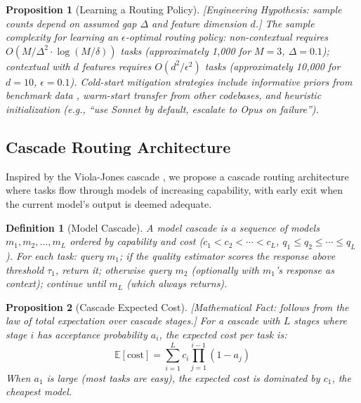 \documentclass[11pt, a4paper]{googledeepmind}
\newtheorem{definition}{Definition}[section]
\newtheorem{proposition}{Proposition}[section]
\begin{document}
\begin{proposition}[Learning a Routing Policy]
\emph{[Engineering Hypothesis: sample counts depend on assumed gap $\Delta$ and feature dimension $d$.]}
\label{prop:routing-sample}
The sample complexity for learning an $\epsilon$-optimal routing policy: non-contextual requires $O(M / \Delta^2 \cdot \log(M / \delta))$ tasks (approximately 1,000 for $M = 3$, $\Delta = 0.1$); contextual with $d$ features requires $O(d^2 / \epsilon^2)$ tasks (approximately 10,000 for $d = 10$, $\epsilon = 0.1$). Cold-start mitigation strategies include informative priors from benchmark data \citep{agrawal2012thompson}, warm-start transfer from other codebases, and heuristic initialization (e.g., ``use Sonnet by default, escalate to Opus on failure'').
\end{proposition}

\subsection{Cascade Routing Architecture}

Inspired by the Viola-Jones cascade \citep{violajones2001, violajones2004}, we propose a cascade routing architecture where tasks flow through models of increasing capability, with early exit when the current model's output is deemed adequate.

\begin{definition}[Model Cascade]
\label{def:routing-cascade}
A \emph{model cascade} is a sequence of models $m_1, m_2, \ldots, m_L$ ordered by capability and cost ($c_1 < c_2 < \cdots < c_L$, $q_1 \leq q_2 \leq \cdots \leq q_L$). For each task: query $m_1$; if the quality estimator scores the response above threshold $\tau_1$, return it; otherwise query $m_2$ (optionally with $m_1$'s response as context); continue until $m_L$ (which always returns).
\end{definition}

\begin{proposition}[Cascade Expected Cost]
\emph{[Mathematical Fact: follows from the law of total expectation over cascade stages.]}
\label{thm:routing-cascadecost}
For a cascade with $L$ stages where stage $i$ has acceptance probability $a_i$, the expected cost per task is:
\begin{equation}
\mathbb{E}[\text{cost}] = \sum_{i=1}^{L} c_i \prod_{j=1}^{i-1}(1 - a_j)
\end{equation}
When $a_1$ is large (most tasks are easy), the expected cost is dominated by $c_1$, the cheapest model.
\end{proposition}
\end{document}
